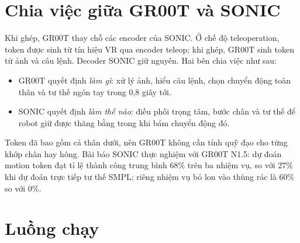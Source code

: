 \documentclass[12pt,a4paper,oneside]{report}
\begin{document}
\section{Chia việc giữa GR00T và SONIC}
\label{sec:roles}

Khi ghép, GR00T thay chỗ các encoder của SONIC. Ở chế độ teleoperation, token được sinh từ tín hiệu VR qua encoder teleop; khi ghép, GR00T sinh token từ ảnh và câu lệnh. Decoder SONIC giữ nguyên. Hai bên chia việc như sau:
\begin{itemize}
\item GR00T quyết định \emph{làm gì}: xử lý ảnh, hiểu câu lệnh, chọn chuyển động toàn thân và tư thế ngón tay trong 0,8 giây tới.
\item SONIC quyết định \emph{làm thế nào}: điều phối trọng tâm, bước chân và tư thế để robot giữ được thăng bằng trong khi bám chuyển động đó.
\end{itemize}
Token đã bao gồm cả thân dưới, nên GR00T không cần tính quỹ đạo cho từng khớp chân hay hông. Bài báo SONIC thực nghiệm với GR00T N1.5: dự đoán motion token đạt tỉ lệ thành công trung bình 68\% trên ba nhiệm vụ, so với 27\% khi dự đoán trực tiếp tư thế SMPL; riêng nhiệm vụ bỏ lon vào thùng rác là 60\% so với 0\%.

\section{Luồng chạy}
\label{sec:runtime}
\end{document}

